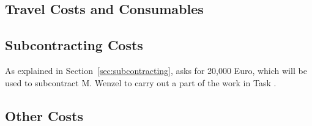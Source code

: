 \subsection{Travel Costs and Consumables}\label{sec:travel-costs}

\subsection{Subcontracting Costs}\label{sec:subcontracting-costs}

As explained in Section~\ref{sec:subcontracting},  asks for 20,000 Euro, which will be used to subcontract M. Wenzel to carry out a part of the work in Task .

\subsection{Other Costs}


